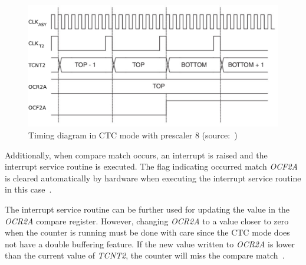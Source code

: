 \begin{figure}
  \centering
  \includegraphics[width=12cm,keepaspectratio]{fig/timing-diagram.pdf}
  \caption{Timing diagram in CTC mode with prescaler 8 (source:~\cite{avr-datasheet})}
  \label{fig:design-timing-diagram}
\end{figure}

Additionally, when compare match occurs,
an interrupt is raised and the interrupt service routine is executed.
The flag indicating occurred match {\it{OCF2A}} is
cleared automatically by hardware when executing
the interrupt service routine in this case~\cite{avr-datasheet}.

The interrupt service routine can be further used for updating the value in the {\it{OCR2A}} compare register.
However, changing {\it{OCR2A}} to a value closer to zero when the counter is running
must be done with care since the CTC mode does not have a double buffering feature.
If the new value written to {\it{OCR2A}} is lower than the current
value of {\it{TCNT2}}, the counter will miss the compare match~\cite{avr-datasheet}.
